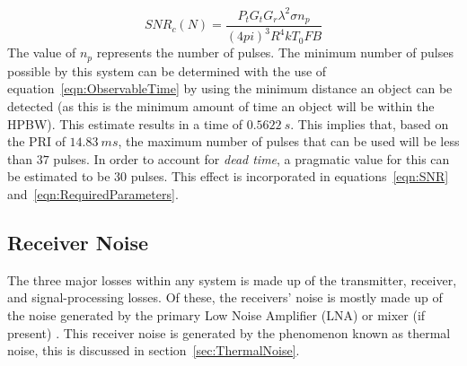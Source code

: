 \documentclass[11pt]{witseiepaper}
\begin{document}
\begin{bibunit}[witseie]
\begin{equation} \label{eqn:MultiplePulses}
SNR_c (N) = \frac{P_{t} G_{t} G_{r} \lambda^2 \sigma n_p}{(4 pi)^3 R^4 k T_0 F B}  
\end{equation}
The value of $n_p$ represents the number of pulses. The minimum number of pulses possible by this system can be determined with the use of equation~\ref{eqn:ObservableTime} by using the minimum distance an object can be detected (as this is the minimum amount of time an object will be within the HPBW). This estimate results in a time of $0.5622~s$. This implies that, based on the PRI of $14.83~ms$, the maximum number of pulses that can be used will be less than $37$ pulses.
In order to account for \textit{dead time}, a pragmatic value for this can be estimated to be $30$ pulses. This effect is incorporated in equations~\ref{eqn:SNR} and~\ref{eqn:RequiredParameters}.

\subsection{Receiver Noise} \label{sec:ReceiverNoise}
The three major losses within any system is made up of the transmitter, receiver, and signal-processing losses.
Of these, the receivers' noise is mostly made up of the noise generated by the primary Low Noise Amplifier (LNA) or mixer (if present) \cite[p.~405]{radarHandbook}.
This receiver noise is generated by the phenomenon known as thermal noise, this is discussed in section~\ref{sec:ThermalNoise}.


\end{bibunit}
\end{document}
